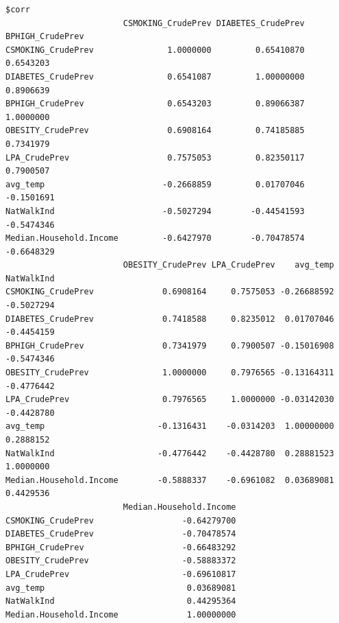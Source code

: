 \documentclass[
]{article}
\begin{document}
\begin{verbatim}
$corr
                        CSMOKING_CrudePrev DIABETES_CrudePrev BPHIGH_CrudePrev
CSMOKING_CrudePrev               1.0000000         0.65410870        0.6543203
DIABETES_CrudePrev               0.6541087         1.00000000        0.8906639
BPHIGH_CrudePrev                 0.6543203         0.89066387        1.0000000
OBESITY_CrudePrev                0.6908164         0.74185885        0.7341979
LPA_CrudePrev                    0.7575053         0.82350117        0.7900507
avg_temp                        -0.2668859         0.01707046       -0.1501691
NatWalkInd                      -0.5027294        -0.44541593       -0.5474346
Median.Household.Income         -0.6427970        -0.70478574       -0.6648329
                        OBESITY_CrudePrev LPA_CrudePrev    avg_temp NatWalkInd
CSMOKING_CrudePrev              0.6908164     0.7575053 -0.26688592 -0.5027294
DIABETES_CrudePrev              0.7418588     0.8235012  0.01707046 -0.4454159
BPHIGH_CrudePrev                0.7341979     0.7900507 -0.15016908 -0.5474346
OBESITY_CrudePrev               1.0000000     0.7976565 -0.13164311 -0.4776442
LPA_CrudePrev                   0.7976565     1.0000000 -0.03142030 -0.4428780
avg_temp                       -0.1316431    -0.0314203  1.00000000  0.2888152
NatWalkInd                     -0.4776442    -0.4428780  0.28881523  1.0000000
Median.Household.Income        -0.5888337    -0.6961082  0.03689081  0.4429536
                        Median.Household.Income
CSMOKING_CrudePrev                  -0.64279700
DIABETES_CrudePrev                  -0.70478574
BPHIGH_CrudePrev                    -0.66483292
OBESITY_CrudePrev                   -0.58883372
LPA_CrudePrev                       -0.69610817
avg_temp                             0.03689081
NatWalkInd                           0.44295364
Median.Household.Income              1.00000000


\end{verbatim}
\end{document}
